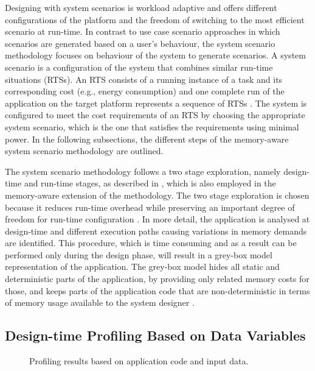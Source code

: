 \documentclass{acm_proc_article-sp}
\begin{document}
Designing with system scenarios is workload adaptive and offers different configurations of the platform and the freedom of switching to the most efficient scenario at run-time. In contrast to use case scenario approaches in which scenarios are generated based on a user's behaviour, the system scenario methodology focuses on behaviour of the system to generate scenarios. A system scenario is a configuration of the system that combines similar run-time situations (RTSs). An RTS consists of a running instance of a task and its corresponding cost (e.g., energy consumption) and one complete run of the application on the target platform represents a sequence of RTSs \cite{Elena2010}. The system is configured to meet the cost requirements of an RTS by choosing the appropriate system scenario, which is the one that satisfies the requirements using minimal power. In the following subsections, the different steps of the memory-aware system scenario methodology are outlined. 

The system scenario methodology follows a two stage exploration, namely design-time and run-time stages, as described in \cite{Gheorghita2007}, which is also employed in the memory-aware extension of the methodology. The two stage exploration is chosen because it reduces run-time overhead while preserving an important degree of freedom for run-time configuration \cite{tcm}. In more detail, the application is analysed at design-time and different execution paths causing variations in memory demands are identified. This procedure, which is time consuming and as a result can be performed only during the design phase, will result in a grey-box model representation of the application. The grey-box model hides all static and deterministic parts of the application, by providing only related memory costs for those, and keeps parts of the application code that are non-deterministic in terms of memory usage available to the system designer \cite{graybox}. 


\subsection{Design-time Profiling Based on Data Variables}

\begin{figure}[!t]
\centering
\caption{Profiling results based on application code and input data.}
\label{fig:profiling}
\end{figure}
\end{document}
